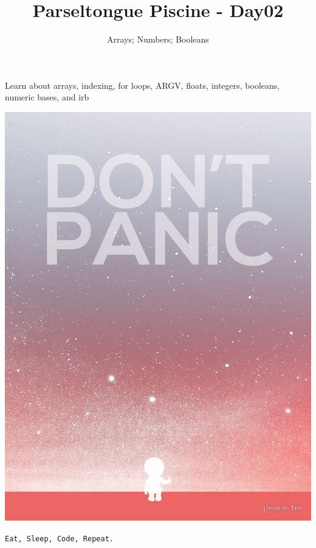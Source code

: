 \documentclass{42-en}
\begin{document}
\title{Parseltongue Piscine - Day02}
\subtitle{Arrays; Numbers; Booleans}


\summary
{
Learn about arrays, indexing, for loops, ARGV, floats, integers, booleans, numeric bases, and irb
}

\maketitle

\tableofcontents


\newpage

\bigskip

\centerline{\includegraphics[width=150mm]{images/dont_panic.jpeg}}

\centerline{\texttt{Eat, Sleep, Code, Repeat.}}

\end{document}
